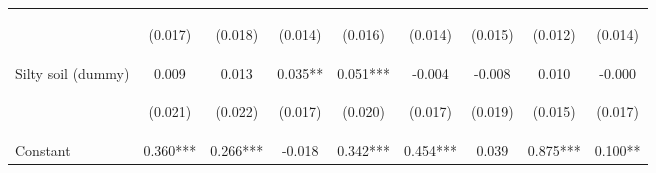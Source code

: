 \begin{center}
\begin{tabular}{lcccccccc}
\vspace{4pt} & \begin{footnotesize}(0.017)\end{footnotesize} & \begin{footnotesize}(0.018)\end{footnotesize} & \begin{footnotesize}(0.014)\end{footnotesize} & \begin{footnotesize}(0.016)\end{footnotesize} & \begin{footnotesize}(0.014)\end{footnotesize} & \begin{footnotesize}(0.015)\end{footnotesize} & \begin{footnotesize}(0.012)\end{footnotesize} & \begin{footnotesize}(0.014)\end{footnotesize} \\
Silty soil (dummy) & 0.009 & 0.013 & 0.035** & 0.051*** & -0.004 & -0.008 & 0.010 & -0.000 \\
\vspace{4pt} & \begin{footnotesize}(0.021)\end{footnotesize} & \begin{footnotesize}(0.022)\end{footnotesize} & \begin{footnotesize}(0.017)\end{footnotesize} & \begin{footnotesize}(0.020)\end{footnotesize} & \begin{footnotesize}(0.017)\end{footnotesize} & \begin{footnotesize}(0.019)\end{footnotesize} & \begin{footnotesize}(0.015)\end{footnotesize} & \begin{footnotesize}(0.017)\end{footnotesize} \\
Constant & 0.360*** & 0.266*** & -0.018 & 0.342*** & 0.454*** & 0.039 & 0.875*** & 0.100** \\

\end{tabular}
\end{center}
